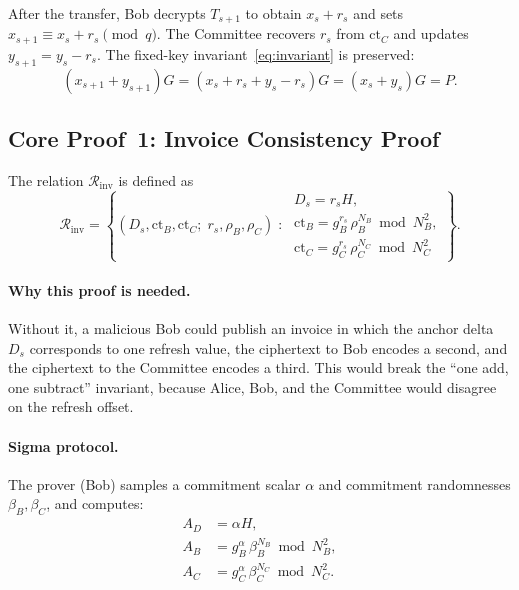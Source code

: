 After the transfer, Bob decrypts $T_{s+1}$ to obtain $x_s + r_s$ and sets $x_{s+1} \equiv x_s + r_s \pmod{q}$. The Committee recovers $r_s$ from $\mathrm{ct}_C$ and updates $y_{s+1} = y_s - r_s$. The fixed-key invariant~\eqref{eq:invariant} is preserved:
$$
(x_{s+1} + y_{s+1})G = (x_s + r_s + y_s - r_s)G = (x_s + y_s)G = P.
$$

\subsection{Core Proof~1: Invoice Consistency Proof}\label{sec:proof1}

\begin{definition}\label{def:inv-relation}
The relation $\mathcal{R}_{\mathrm{inv}}$ is defined as
$$
\mathcal{R}_{\mathrm{inv}} = \left\{
  (D_s, \mathrm{ct}_B, \mathrm{ct}_C ;\; r_s, \rho_B, \rho_C) \;:\;
  \begin{array}{l}
  D_s = r_s H, \\[2pt]
  \mathrm{ct}_B = g_B^{r_s}\, \rho_B^{N_B} \bmod N_B^2, \\[2pt]
  \mathrm{ct}_C = g_C^{r_s}\, \rho_C^{N_C} \bmod N_C^2
  \end{array}
\right\}.
$$
\end{definition}

\paragraph{Why this proof is needed.} Without it, a malicious Bob could publish an invoice in which the anchor delta $D_s$ corresponds to one refresh value, the ciphertext to Bob encodes a second, and the ciphertext to the Committee encodes a third. This would break the ``one add, one subtract'' invariant, because Alice, Bob, and the Committee would disagree on the refresh offset.

\paragraph{Sigma protocol.} The prover (Bob) samples a commitment scalar $\alpha$ and commitment randomnesses $\beta_B, \beta_C$, and computes:
\begin{align*}
A_D &= \alpha H, \\
A_B &= g_B^{\alpha}\, \beta_B^{N_B} \bmod N_B^2, \\
A_C &= g_C^{\alpha}\, \beta_C^{N_C} \bmod N_C^2.
\end{align*}

